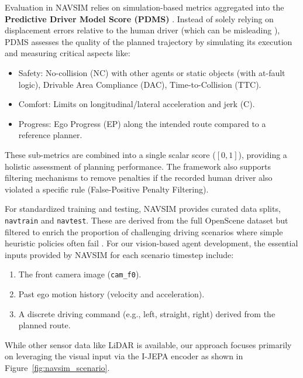 \documentclass{article}
\begin{document}
Evaluation in NAVSIM relies on simulation-based metrics aggregated into the \textbf{Predictive Driver Model Score (PDMS)} \cite{dauner2024navsim, hallgarten2023pdm}. Instead of solely relying on displacement errors relative to the human driver (which can be misleading \cite{zhairet2023rethinking}), PDMS assesses the quality of the planned trajectory by simulating its execution and measuring critical aspects like:
\begin{itemize}
    \item Safety: No-collision (NC) with other agents or static objects (with at-fault logic), Drivable Area Compliance (DAC), Time-to-Collision (TTC).
    \item Comfort: Limits on longitudinal/lateral acceleration and jerk (C).
    \item Progress: Ego Progress (EP) along the intended route compared to a reference planner.
\end{itemize}
These sub-metrics are combined into a single scalar score ($[0, 1]$), providing a holistic assessment of planning performance. The framework also supports filtering mechanisms to remove penalties if the recorded human driver also violated a specific rule (False-Positive Penalty Filtering).

For standardized training and testing, NAVSIM provides curated data splits, \texttt{navtrain} and \texttt{navtest}. These are derived from the full OpenScene dataset but filtered to enrich the proportion of challenging driving scenarios where simple heuristic policies often fail \cite{dauner2024navsim}. For our vision-based agent development, the essential inputs provided by NAVSIM for each scenario timestep include:
\begin{enumerate}
    \item The front camera image (\texttt{cam\_f0}).
    \item Past ego motion history (velocity and acceleration).
    \item A discrete driving command (e.g., left, straight, right) derived from the planned route.
\end{enumerate}
While other sensor data like LiDAR is available, our approach focuses primarily on leveraging the visual input via the I-JEPA encoder as shown in Figure~\ref{fig:navsim_scenario}. 
\end{document}
